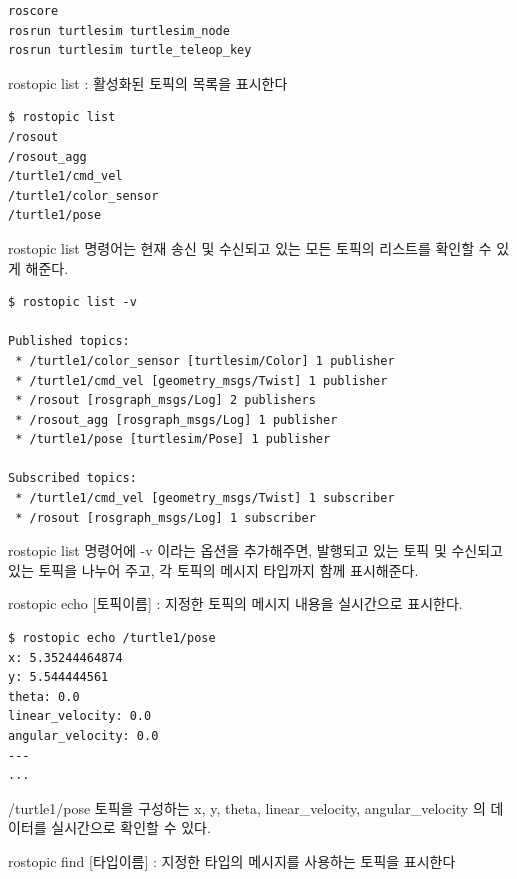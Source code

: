 \begin{lstlisting}[language=ROS]
roscore
rosrun turtlesim turtlesim_node 
rosrun turtlesim turtle_teleop_key
\end{lstlisting}

\setcounter{num}{0}

\noindent
{}\circled{\thenum} rostopic list : 활성화된 토픽의 목록을 표시한다

\begin{lstlisting}[language=ROS]
$ rostopic list
/rosout
/rosout_agg
/turtle1/cmd_vel
/turtle1/color_sensor
/turtle1/pose
\end{lstlisting}

\noindent
rostopic list 명령어는 현재 송신 및 수신되고 있는 모든 토픽의 리스트를 확인할 수 있게 해준다.

\begin{lstlisting}[language=ROS]
$ rostopic list -v

Published topics:
 * /turtle1/color_sensor [turtlesim/Color] 1 publisher
 * /turtle1/cmd_vel [geometry_msgs/Twist] 1 publisher
 * /rosout [rosgraph_msgs/Log] 2 publishers
 * /rosout_agg [rosgraph_msgs/Log] 1 publisher
 * /turtle1/pose [turtlesim/Pose] 1 publisher

Subscribed topics:
 * /turtle1/cmd_vel [geometry_msgs/Twist] 1 subscriber
 * /rosout [rosgraph_msgs/Log] 1 subscriber
\end{lstlisting}

\noindent
rostopic list 명령어에 -v 이라는 옵션을 추가해주면, 발행되고 있는 토픽 및 수신되고 있는 토픽을 나누어 주고, 각 토픽의 메시지 타입까지 함께 표시해준다.

\vspace{\baselineskip}
\noindent
{}\circled{\thenum} rostopic echo [토픽이름] : 지정한 토픽의 메시지 내용을 실시간으로 표시한다.

\begin{lstlisting}[language=ROS]
$ rostopic echo /turtle1/pose 
x: 5.35244464874
y: 5.544444561
theta: 0.0
linear_velocity: 0.0
angular_velocity: 0.0
---
...
\end{lstlisting}

\noindent
/turtle1/pose 토픽을 구성하는 x, y, theta, linear\_velocity, angular\_velocity 의 데이터를 실시간으로 확인할 수 있다.

\vspace{\baselineskip}
\noindent
{}\circled{\thenum} rostopic find [타입이름] : 지정한 타입의 메시지를 사용하는 토픽을 표시한다

